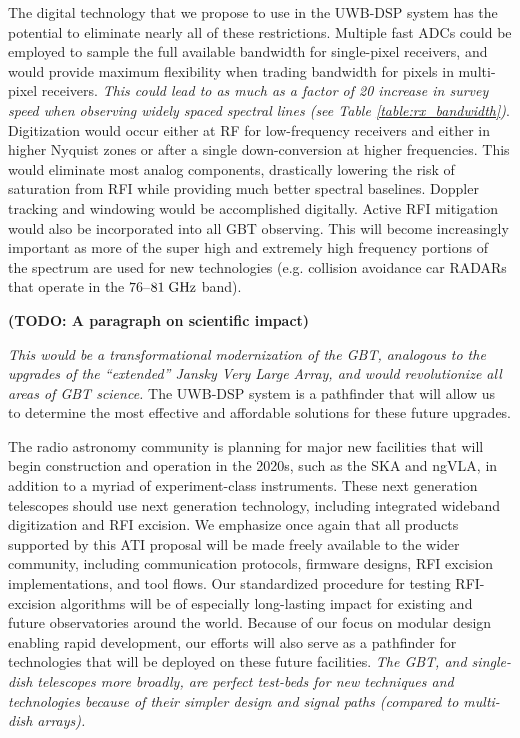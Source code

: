 \documentclass[10pt]{myNSF}
\begin{document}
The digital technology that we propose to use in the UWB-DSP system
has the potential to eliminate nearly all of these restrictions.
Multiple fast ADCs could be employed to sample the full available
bandwidth for single-pixel receivers, and would provide maximum
flexibility when trading bandwidth for pixels in multi-pixel
receivers.  \emph{This could lead to as much as a factor of 20
  increase in survey speed when observing widely spaced spectral lines
  (see Table \ref{table:rx_bandwidth})}.  Digitization would occur
either at RF for low-frequency receivers and either in higher Nyquist
zones or after a single down-conversion at higher frequencies.  This
would eliminate most analog components, drastically lowering the risk
of saturation from RFI while providing much better spectral baselines.
Doppler tracking and windowing would be accomplished digitally.
Active RFI mitigation would also be incorporated into all GBT
observing.  This will become increasingly important as more of the
super high and extremely high frequency portions of the spectrum are
used for new technologies (e.g. collision avoidance car RADARs that
operate in the $76$--$81\; \textrm{GHz}$ band).

\textbf{(TODO: A paragraph on scientific impact)}

\emph{This would be a transformational modernization of
  the GBT, analogous to the upgrades of the ``extended'' Jansky Very
  Large Array, and would revolutionize all areas of GBT science.}  The
UWB-DSP system is a pathfinder that will allow us to determine the
most effective and affordable solutions for these future upgrades.


The radio astronomy community is planning for major new facilities
that will begin construction and operation in the 2020s, such as the
SKA and ngVLA, in addition to a myriad of experiment-class
instruments.  These next generation telescopes should use next
generation technology, including integrated wideband digitization and
RFI excision.  We emphasize once again that all products supported by
this ATI proposal will be made freely available to the wider
community, including communication protocols, firmware designs, RFI
excision implementations, and tool flows.  Our standardized procedure
for testing RFI-excision algorithms will be of especially long-lasting
impact for existing and future observatories around the world.
Because of our focus on modular design enabling rapid development, our
efforts will also serve as a pathfinder for technologies that will be
deployed on these future facilities.  \emph{The GBT, and single-dish
  telescopes more broadly, are perfect test-beds for new techniques
  and technologies because of their simpler design and signal paths
  (compared to multi-dish arrays).}
\end{document}
